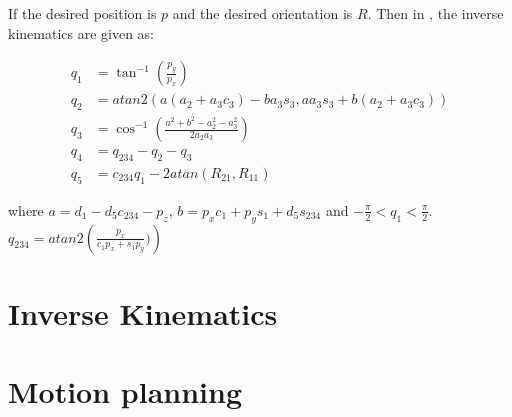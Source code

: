 If the desired position is $p$ and the desired orientation is $R$. Then in \cite{Kinematics}, the inverse kinematics are given as: 

\begin{align*}
    q_1 &= \tan^{-1}{\left(\frac{p_y}{p_x}\right)}\\
    q_2 &= atan2\left( a(a_2+a_3c_3) - ba_3s_3, aa_3s_3 + b(a_2+a_3c_3) \right)\\%
    q_3 &= \cos^{-1}{\left(\frac{a^2+b^2-a^2_2-a^2_3}{2a_2a_3}\right)}\\
    q_4 &= q_{234} - q_2 - q_3\\
    q_5 &= c_{234}q_1-2atan(R_{21},R_{11})
\end{align*}

where $a = d_1 - d_5c_{234}-p_z$, $b = p_xc_1 + p_ys_1+d_5s_{234}$ and $-\frac{\pi}{2}<q_1 < \frac{\pi}{2}$. $q_{234} = atan2\left(\frac{p_x}{c_1p_x+s_1p_y})\right)$



\section{Inverse Kinematics}
\section{Motion planning}